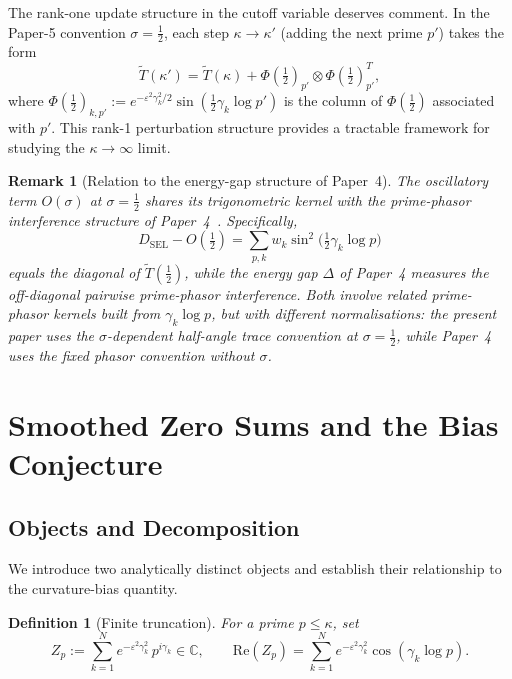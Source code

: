 \documentclass[11pt]{article}
\newtheorem{definition}[theorem]{Definition}
\newtheorem*{remark}{Remark}
\newcommand{\Tt}{\widetilde{T}}
\newcommand{\DSEL}{D_{\mathrm{SEL}}}
\begin{document}
The rank-one update structure in the cutoff variable deserves comment.
In the Paper-5 convention $\sigma=\tfrac12$,
each step $\kappa\to\kappa'$ (adding the next prime $p'$) takes the form
\[
\Tt(\kappa') = \Tt(\kappa) + \Phi(\tfrac12)_{p'}\otimes\Phi(\tfrac12)_{p'}^T,
\]
where $\Phi(\tfrac12)_{k,p'} :=
  e^{-\varepsilon^2\gamma_k^2/2}\sin(\tfrac12\gamma_k\log p')$
is the column of $\Phi(\tfrac12)$ associated with $p'$.
This rank-1 perturbation structure provides a tractable framework for
studying the $\kappa\to\infty$ limit.

\begin{remark}[Relation to the energy-gap structure of Paper~4]
The oscillatory term $O(\sigma)$ at $\sigma=\tfrac12$
shares its trigonometric kernel with the prime-phasor
interference structure of Paper~4~\cite{Paper4}.
Specifically,
\[
\DSEL - O(\tfrac12)
= \sum_{p,k} w_k \sin^2\!\bigl(\tfrac12\gamma_k\log p\bigr)
\]
equals the diagonal of $\widetilde T(\tfrac12)$, while
the energy gap $\Delta$ of Paper~4 measures the
off-diagonal pairwise prime-phasor interference.
Both involve related prime-phasor kernels built
from $\gamma_k\log p$, but with different
normalisations: the present paper uses the
$\sigma$-dependent half-angle trace convention
at $\sigma=\tfrac12$, while Paper~4 uses the
fixed phasor convention without $\sigma$.
\end{remark}

\section{Smoothed Zero Sums and the Bias Conjecture}
\label{sec:smoothed}

\subsection{Objects and Decomposition}
\label{ssec:objects}

We introduce two analytically distinct objects and establish their
relationship to the curvature-bias quantity.

\begin{definition}[Finite truncation]
\label{def:Zp}
For a prime $p\leq\kappa$, set
\[
Z_p := \sum_{k=1}^N e^{-\varepsilon^2\gamma_k^2}\,p^{i\gamma_k}\in\mathbb{C},
\qquad
\mathrm{Re}(Z_p) = \sum_{k=1}^N e^{-\varepsilon^2\gamma_k^2}\cos(\gamma_k\log p).
\]
\end{definition}
\end{document}
